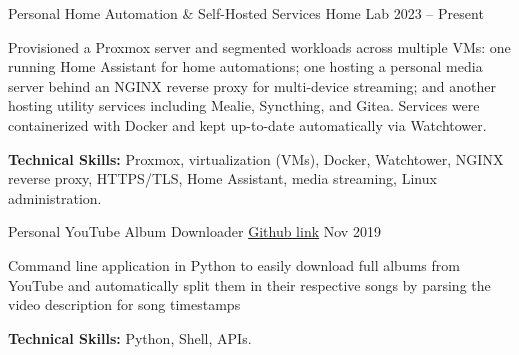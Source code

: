 

\begin{cventries}

  \cventry
    {Personal} %
    {Home Automation \& Self-Hosted Services} %
    {Home Lab} %
    {2023 -- Present} %
    {
      \begin{cvitems} %
        \item {Provisioned a Proxmox server and segmented workloads across multiple VMs: one running Home Assistant for home automations; one hosting a personal media server behind an NGINX reverse proxy for multi-device streaming; and another hosting utility services including Mealie, Syncthing, and Gitea. Services were containerized with Docker and kept up-to-date automatically via Watchtower.}
        \item {\textbf{Technical Skills:} Proxmox, virtualization (VMs), Docker, Watchtower, NGINX reverse proxy, HTTPS/TLS, Home Assistant, media streaming, Linux administration.}
      \end{cvitems}
    }

  \cventry
    {Personal} %
    {YouTube Album Downloader} %
    {\href{https://github.com/Panagiotis-Zachos/youtube-downloader-autosplit}{Github link}} %
    {Nov 2019} %
    {
      \begin{cvitems} %
        \item {Command line application in Python to easily download full albums from YouTube and automatically split them in their respective songs by parsing the video description for song timestamps}
        \item {\textbf{Technical Skills:} Python, Shell, APIs.}
      \end{cvitems}
    }




\end{cventries}
